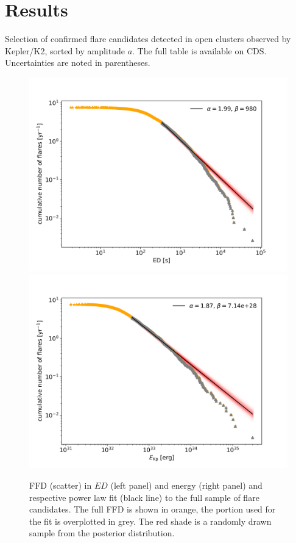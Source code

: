 \documentclass{aa}
\begin{document}
\section{Results}
\label{sec:results}
\begin{table}
\caption{Selection of confirmed flare candidates detected in open clusters observed by Kepler/K2, sorted by amplitude $a$. The full table is available on CDS.  Uncertainties are noted in parentheses.}
\label{tab:flares}
\centering
\footnotesize

\end{table}
\begin{figure}
    \centering
    \includegraphics[width=0.49\hsize]{pics/FFDs/full_sample_ffd_ED_wheatland.png}
    \hspace{.01cm}
    \includegraphics[width=0.49\hsize]{pics/FFDs/full_sample_ffd_energy_wheatland.png}
    \caption{FFD (scatter) in $ED$ (left panel) and energy (right panel) and respective power law fit (black line) to the full sample of flare candidates. The full FFD is shown in orange, the portion used for the fit is overplotted in grey. The red shade is a randomly drawn sample from the posterior distribution.}      
    \label{fig:powerlawfit_full}
\end{figure}
\end{document}
